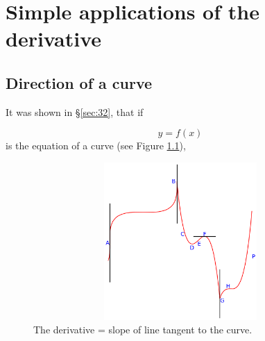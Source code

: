 
\chapter{Simple applications of the derivative}

 
\section{Direction of a curve}
\label{sec:64}

It was shown in \S \ref{sec:32}, %
that if

\[
    y = f(x)
\]
is the equation of a curve (see Figure \ref{fig:tangent-example}), 

\begin{figure}[h!]
\begin{minipage}{\textwidth}
\begin{center}
\includegraphics[height=6cm,width=12cm]{curve-tangent.eps}
\end{center}
\end{minipage}
\caption{The derivative = slope of line tangent to the curve.}
\label{fig:tangent-example}
\end{figure}

